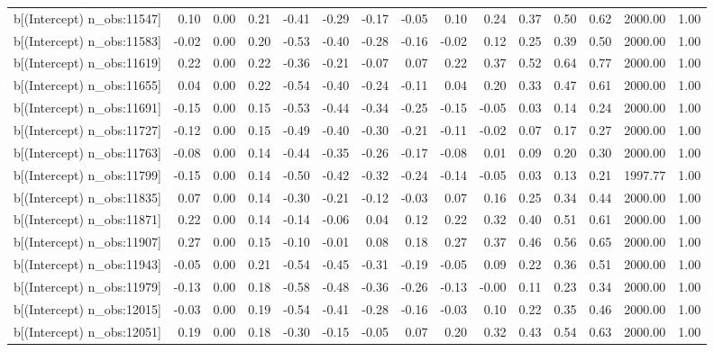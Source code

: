 \begin{table}[ht]
\begin{tabular}{rrrrrrrrrrrrrrr}
  b[(Intercept) n\_obs:11547] & 0.10 & 0.00 & 0.21 & -0.41 & -0.29 & -0.17 & -0.05 & 0.10 & 0.24 & 0.37 & 0.50 & 0.62 & 2000.00 & 1.00 \\ 
  b[(Intercept) n\_obs:11583] & -0.02 & 0.00 & 0.20 & -0.53 & -0.40 & -0.28 & -0.16 & -0.02 & 0.12 & 0.25 & 0.39 & 0.50 & 2000.00 & 1.00 \\ 
  b[(Intercept) n\_obs:11619] & 0.22 & 0.00 & 0.22 & -0.36 & -0.21 & -0.07 & 0.07 & 0.22 & 0.37 & 0.52 & 0.64 & 0.77 & 2000.00 & 1.00 \\ 
  b[(Intercept) n\_obs:11655] & 0.04 & 0.00 & 0.22 & -0.54 & -0.40 & -0.24 & -0.11 & 0.04 & 0.20 & 0.33 & 0.47 & 0.61 & 2000.00 & 1.00 \\ 
  b[(Intercept) n\_obs:11691] & -0.15 & 0.00 & 0.15 & -0.53 & -0.44 & -0.34 & -0.25 & -0.15 & -0.05 & 0.03 & 0.14 & 0.24 & 2000.00 & 1.00 \\ 
  b[(Intercept) n\_obs:11727] & -0.12 & 0.00 & 0.15 & -0.49 & -0.40 & -0.30 & -0.21 & -0.11 & -0.02 & 0.07 & 0.17 & 0.27 & 2000.00 & 1.00 \\ 
  b[(Intercept) n\_obs:11763] & -0.08 & 0.00 & 0.14 & -0.44 & -0.35 & -0.26 & -0.17 & -0.08 & 0.01 & 0.09 & 0.20 & 0.30 & 2000.00 & 1.00 \\ 
  b[(Intercept) n\_obs:11799] & -0.15 & 0.00 & 0.14 & -0.50 & -0.42 & -0.32 & -0.24 & -0.14 & -0.05 & 0.03 & 0.13 & 0.21 & 1997.77 & 1.00 \\ 
  b[(Intercept) n\_obs:11835] & 0.07 & 0.00 & 0.14 & -0.30 & -0.21 & -0.12 & -0.03 & 0.07 & 0.16 & 0.25 & 0.34 & 0.44 & 2000.00 & 1.00 \\ 
  b[(Intercept) n\_obs:11871] & 0.22 & 0.00 & 0.14 & -0.14 & -0.06 & 0.04 & 0.12 & 0.22 & 0.32 & 0.40 & 0.51 & 0.61 & 2000.00 & 1.00 \\ 
  b[(Intercept) n\_obs:11907] & 0.27 & 0.00 & 0.15 & -0.10 & -0.01 & 0.08 & 0.18 & 0.27 & 0.37 & 0.46 & 0.56 & 0.65 & 2000.00 & 1.00 \\ 
  b[(Intercept) n\_obs:11943] & -0.05 & 0.00 & 0.21 & -0.54 & -0.45 & -0.31 & -0.19 & -0.05 & 0.09 & 0.22 & 0.36 & 0.51 & 2000.00 & 1.00 \\ 
  b[(Intercept) n\_obs:11979] & -0.13 & 0.00 & 0.18 & -0.58 & -0.48 & -0.36 & -0.26 & -0.13 & -0.00 & 0.11 & 0.23 & 0.34 & 2000.00 & 1.00 \\ 
  b[(Intercept) n\_obs:12015] & -0.03 & 0.00 & 0.19 & -0.54 & -0.41 & -0.28 & -0.16 & -0.03 & 0.10 & 0.22 & 0.35 & 0.46 & 2000.00 & 1.00 \\ 
  b[(Intercept) n\_obs:12051] & 0.19 & 0.00 & 0.18 & -0.30 & -0.15 & -0.05 & 0.07 & 0.20 & 0.32 & 0.43 & 0.54 & 0.63 & 2000.00 & 1.00 \\ 

\end{tabular}
\end{table}
